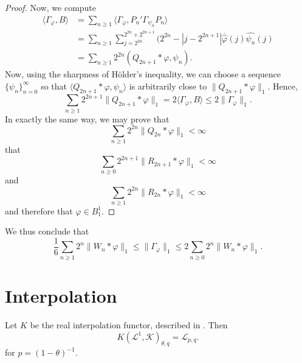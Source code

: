 \documentclass{unswmaths}
\begin{document}
\begin{proof}
    Now, we compute
    \begin{align*}
        \langle \Gamma_\varphi,B \rangle &= \sum_{n\geq 1} \langle \Gamma_\varphi,P_n'\Gamma_{\psi_n}P_n\rangle\\
        &= \sum_{n\geq 1} \sum_{j=2^{2n}}^{2^{2n}+2^{2n+1}}(2^{2n}-|j-2^{2n+1}|\overline{\widehat{\varphi}}(j)\widehat{\psi_n}(j)\\
        &= \sum_{n\geq 1} 2^{2n} (Q_{2n+1}*\varphi,\psi_n).
    \end{align*}
    Now, using the sharpness of H\"older's inequality, we can choose
    a sequence $\{\psi_n\}_{n=0}^\infty$ so that $\langle Q_{2n+1}*\varphi,\psi_n\rangle$
    is arbitrarily close to $\|Q_{2n+1}*\varphi\|_1$. Hence,
    \begin{equation*}
        \sum_{n\geq 1}2^{2n+1}\|Q_{2n+1}*\varphi\|_1 = 2\langle \Gamma_\varphi,B\rangle \leq 2\|\Gamma_\varphi\|_1.
    \end{equation*}
    In exactly the same way, we may prove that
    \begin{equation*}
        \sum_{n\geq 1}2^{2n}\|Q_{2n}*\varphi\|_1 < \infty
    \end{equation*} 
    that
    \begin{equation*}
        \sum_{n\geq 0} 2^{2n+1} \|R_{2n+1}*\varphi\|_1 < \infty
    \end{equation*}
    and
    \begin{equation*}
        \sum_{n\geq 1} 2^{2n}\|R_{2n}*\varphi\|_1 < \infty
    \end{equation*}
    and therefore that $\varphi \in B_1^1$.
\end{proof} 

\begin{remark}
    We thus conclude that
    \begin{equation*}
        \frac{1}{6}\sum_{n\geq 1}2^n \|W_n*\varphi\|_1 \leq \|\Gamma_\varphi\|_1 \leq 2\sum_{n\geq 0} 2^n\|W_n*\varphi\|_1.
    \end{equation*}
\end{remark}

\section{Interpolation}
\begin{lemma}
    Let $K$ be the real interpolation functor, described in \cite{interp}. Then
    \begin{equation*}
        K(\mathcal{L}^1,\mathcal{K})_{\theta,q} = \mathcal{L}_{p,q}.
    \end{equation*} 
    for $p = (1-\theta)^{-1}$.
\end{lemma}
\end{document}
